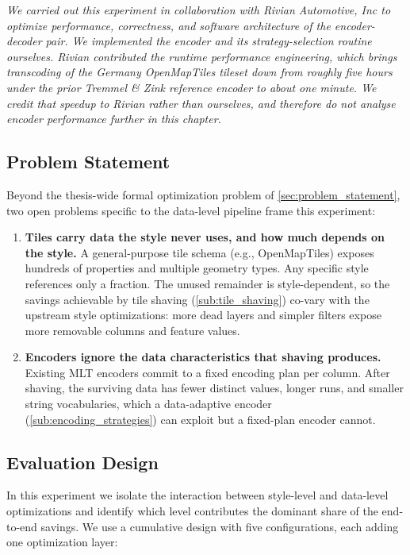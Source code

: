 \textit{We carried out this experiment in collaboration with Rivian Automotive, Inc to optimize performance, correctness, and software architecture of the encoder-decoder pair.
We implemented the encoder and its strategy-selection routine ourselves.
Rivian contributed the runtime performance engineering, which brings transcoding of the Germany OpenMapTiles tileset down from roughly five hours under the prior Tremmel \& Zink reference encoder to about one minute.
We credit that speedup to Rivian rather than ourselves, and therefore do not analyse encoder performance further in this chapter.}

\subsection{Problem Statement}\label{sub:mlt_problem}

Beyond the thesis-wide formal optimization problem of \cref{sec:problem_statement}, two open problems specific to the data-level pipeline frame this experiment:

\begin{enumerate}
    \item \textbf{Tiles carry data the style never uses, and how much depends on the style.}
    A general-purpose tile schema (e.g., OpenMapTiles) exposes hundreds of properties and multiple geometry types.
Any specific style references only a fraction.
    The unused remainder is style-dependent, so the savings achievable by tile shaving (\cref{sub:tile_shaving}) co-vary with the upstream style optimizations:
    more dead layers and simpler filters expose more removable columns and feature values.

    \item \textbf{Encoders ignore the data characteristics that shaving produces.}
    Existing \ac{MLT} encoders commit to a fixed encoding plan per column.
    After shaving, the surviving data has fewer distinct values, longer runs, and smaller string vocabularies, which a data-adaptive encoder (\cref{sub:encoding_strategies}) can exploit but a fixed-plan encoder cannot.
\end{enumerate}

\subsection{Evaluation Design}\label{sub:mlt_evaluation}

In this experiment we isolate the interaction between style-level and data-level optimizations and identify which level contributes the dominant share of the end-to-end savings.
We use a cumulative design with five configurations, each adding one optimization layer:

